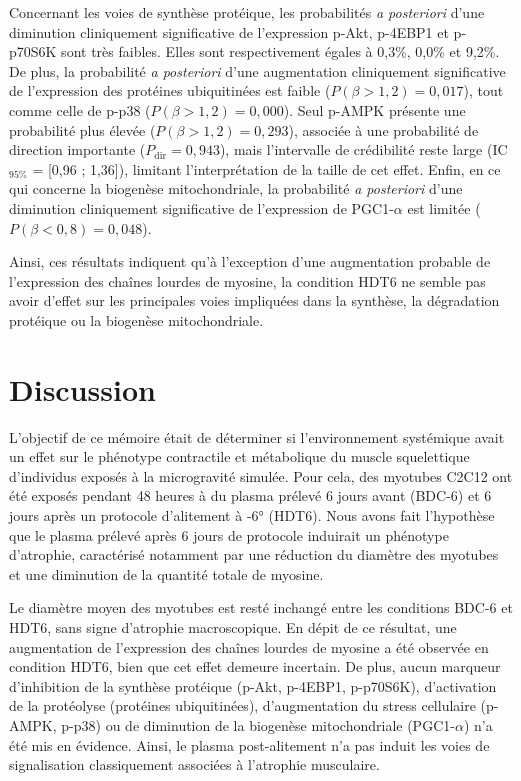 \documentclass[11pt]{report}
\begin{document}
Concernant les voies de synthèse protéique, les probabilités \textit{a posteriori} d'une diminution cliniquement significative de l'expression p-Akt, p-4EBP1 et p-p70S6K sont très faibles. Elles sont respectivement égales à 0,3\%, 0,0\% et 9,2\%. De plus, la probabilité \textit{a posteriori} d'une augmentation cliniquement significative de l'expression des protéines ubiquitinées est faible ($P(\beta > 1,2) = 0,017$), tout comme celle de p-p38 ($P(\beta > 1,2) = 0,000$). Seul p-AMPK présente une probabilité plus élevée ($P(\beta > 1,2) = 0,293$), associée à une probabilité de direction importante ($P_{\text{dir}} = 0,943$), mais l'intervalle de crédibilité reste large (IC$_{95\%}$ = [0,96 ; 1,36]), limitant l'interprétation de la taille de cet effet. Enfin, en ce qui concerne la biogenèse mitochondriale, la probabilité \textit{a posteriori} d'une diminution cliniquement significative de l'expression de PGC1-$\alpha$ est limitée ($P(\beta < 0,8) = 0,048$).

\medskip Ainsi, ces résultats indiquent qu'à l'exception d'une augmentation probable de l'expression des chaînes lourdes de myosine, la condition HDT6 ne semble pas avoir d'effet sur les principales voies impliquées dans la synthèse, la dégradation protéique ou la biogenèse mitochondriale.

\chapter{Discussion}

L'objectif de ce mémoire était de déterminer si l'environnement systémique avait un effet sur le phénotype contractile et métabolique du muscle squelettique d'individus exposés à la microgravité simulée. Pour cela, des myotubes C2C12 ont été exposés pendant 48 heures à du plasma prélevé 6 jours avant (BDC-6) et 6 jours après un protocole d'alitement à -6° (HDT6). Nous avons fait l'hypothèse que le plasma prélevé après 6 jours de protocole induirait un phénotype d'atrophie, caractérisé notamment par une réduction du diamètre des myotubes et une diminution de la quantité totale de myosine.

Le diamètre moyen des myotubes est resté inchangé entre les conditions BDC-6 et HDT6, sans signe d'atrophie macroscopique. En dépit de ce résultat, une augmentation de l'expression des chaînes lourdes de myosine a été observée en condition HDT6, bien que cet effet demeure incertain. De plus, aucun marqueur d'inhibition de la synthèse protéique (p-Akt, p-4EBP1, p-p70S6K), d'activation de la protéolyse (protéines ubiquitinées), d'augmentation du stress cellulaire (p-AMPK, p-p38) ou de diminution de la biogenèse mitochondriale (PGC1-$\alpha$) n'a été mis en évidence. Ainsi, le plasma post-alitement n'a pas induit les voies de signalisation classiquement associées à l'atrophie musculaire.
\end{document}
